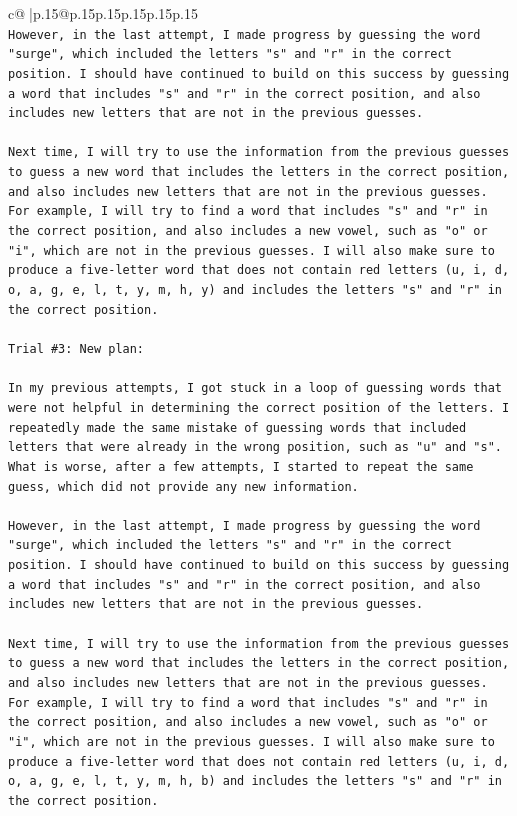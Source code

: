 \documentclass{article}
\begin{document}
{\begin{supertabular}{c@{$\;$}|p{.15\linewidth}@{}p{.15\linewidth}p{.15\linewidth}p{.15\linewidth}p{.15\linewidth}p{.15\linewidth}}
{{{\\ 
\texttt{However, in the last attempt, I made progress by guessing the word "surge", which included the letters "s" and "r" in the correct position. I should have continued to build on this success by guessing a word that includes "s" and "r" in the correct position, and also includes new letters that are not in the previous guesses. } \\
\\ 
\texttt{Next time, I will try to use the information from the previous guesses to guess a new word that includes the letters in the correct position, and also includes new letters that are not in the previous guesses. For example, I will try to find a word that includes "s" and "r" in the correct position, and also includes a new vowel, such as "o" or "i", which are not in the previous guesses. I will also make sure to produce a five{-}letter word that does not contain red letters (u, i, d, o, a, g, e, l, t, y, m, h, y) and includes the letters "s" and "r" in the correct position.} \\
\\ 
\texttt{Trial \#3: New plan: } \\
\\ 
\texttt{In my previous attempts, I got stuck in a loop of guessing words that were not helpful in determining the correct position of the letters. I repeatedly made the same mistake of guessing words that included letters that were already in the wrong position, such as "u" and "s". What is worse, after a few attempts, I started to repeat the same guess, which did not provide any new information. } \\
\\ 
\texttt{However, in the last attempt, I made progress by guessing the word "surge", which included the letters "s" and "r" in the correct position. I should have continued to build on this success by guessing a word that includes "s" and "r" in the correct position, and also includes new letters that are not in the previous guesses. } \\
\\ 
\texttt{Next time, I will try to use the information from the previous guesses to guess a new word that includes the letters in the correct position, and also includes new letters that are not in the previous guesses. For example, I will try to find a word that includes "s" and "r" in the correct position, and also includes a new vowel, such as "o" or "i", which are not in the previous guesses. I will also make sure to produce a five{-}letter word that does not contain red letters (u, i, d, o, a, g, e, l, t, y, m, h, b) and includes the letters "s" and "r" in the correct position.} \\
}}}
\end{supertabular}}
\end{document}

